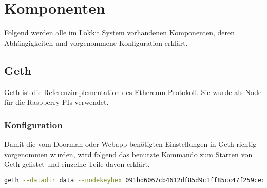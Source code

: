\section{Komponenten}
\label{sys_sec:Komponenten}
Folgend werden alle im Lokkit System vorhandenen Komponenten, deren Abhängigkeiten und vorgenommene Konfiguration erklärt.

\subsection{Geth}
\label{sys_subsec:Geth}
Geth ist die Referenzimplementation des Ethereum Protokoll. Sie wurde als Node für die Raspberry PIs verwendet.\cite{go-ethereum}

\subsubsection{Konfiguration}
Damit die vom Doorman oder Webapp benötigten Einstellungen in Geth richtig vorgenommen wurden, wird folgend das benutzte Kommando zum Starten von Geth gelistet und einzelne Teile davon erklärt.
\begin{lstlisting}[language=bash,caption={Beispielkommando für das Starten einer Node für Doorman oder Webapp}]
geth --datadir data --nodekeyhex 091bd6067cb4612df85d9c1ff85cc47f259ced4d4cd99816b14f35650f59c322 --rpc --rpcport 8545 --rpcaddr "127.0.0.1" -shh --rpcapi "ws,eth,net,web3,admin,personal,shh" --networkid 42 --ipcpath lokkit  --port "30303" --lightserv 50 --rpccorsdomain "*"
\end{lstlisting}

